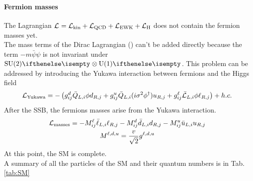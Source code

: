 \paragraph*{Fermion masses}
The Lagrangian $\mathcal{L}_\text{}=\mathcal{L}_\text{kin}+\mathcal{L}_\text{QCD}+\mathcal{L}_\text{EWK}+\mathcal{L}_\text{H}$ does not contain the fermion masses yet.\\
The mass terms of the Dirac Lagrangian () can't be added directly because the term \(-m \bar{\psi} \psi\) is not invariant under $\SU{2}\otimes \U{1}$.
This problem can be addressed by introducing the Yukawa interaction between fermions and the Higgs field
\begin{equation}
    \mathcal{L}_\text{Yukawa}=-\left(g_{i j}^{d}\bar{Q}_{L,i}\phi d_{R,j}+g_{i j}^{u}\bar{Q}_{L,i}(i\sigma^{2}\phi^{\dagger})u_{R,j}+g_{i j}^{\ell}\bar{\mathcal{L}}_{L,i}\phi\ell_{R,j}\right)+h.c.
\end{equation}
After the SSB, the fermions masses arise from the Yukawa interaction.
\begin{gather}
    \mathcal{L}_\text{masses}=-M_{i j}^{\ell}\bar{\ell}_{L,i}\ell_{R,j}-M_{i j}^{d}\bar{d}_{L,i}d_{R,j}-M_{i j}^{u}\bar{u}_{L,i}u_{R,j}\\
    M^{\ell,d,u}=\frac{v}{\sqrt{2}}g^{\ell,d,u}
\end{gather}
At this point, the SM is complete.\\ 
A summary of all the particles of the SM and their quantum numbers is in Tab. \ref{tab:SM}



